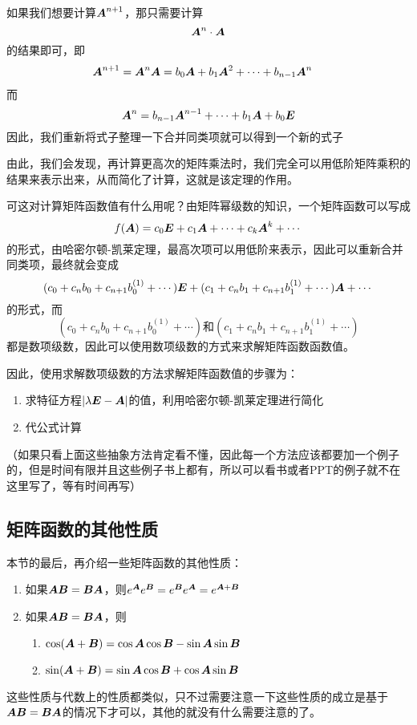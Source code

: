 \documentclass[12pt, a4paper, oneside, UTF8]{ctexbook}
\begin{document}
如果我们想要计算$\boldsymbol{A}^{n+1}$，那只需要计算\[\boldsymbol{A}^n\cdot\boldsymbol{A}\]的结果即可，即
\[
\begin{aligned}\boldsymbol{A}^{n+1}&=\boldsymbol{A}^n\boldsymbol{A}=b_0\boldsymbol{A}+b_1\boldsymbol{A}^2+\cdots+b_{n-1}\boldsymbol{A}^n
\end{aligned}\]
而\[\boldsymbol{A}^n=b_{n-1}\boldsymbol{A}^{n-1}+\cdots+b_1\boldsymbol{A}+b_0\boldsymbol{E}\]因此，我们重新将式子整理一下合并同类项就可以得到一个新的式子

由此，我们会发现，再计算更高次的矩阵乘法时，我们完全可以用低阶矩阵乘积的结果来表示出来，从而简化了计算，这就是该定理的作用。

可这对计算矩阵函数值有什么用呢？由矩阵幂级数的知识，一个矩阵函数可以写成\[f(\boldsymbol{A})=c_0\boldsymbol{E}+c_1\boldsymbol{A}+\cdots+c_k\boldsymbol{A}^k+\cdots\]的形式，由哈密尔顿-凯莱定理，最高次项可以用低阶来表示，因此可以重新合并同类项，最终就会变成\[(c_0+c_nb_0+c_{n+1}b_0^{(1)}+\cdots)\boldsymbol{E}+(c_1+c_nb_1+c_{n+1}b_1^{(1)}+\cdots)\boldsymbol{A}+\cdots\]的形式，而\[(c_0+c_nb_0+c_{n+1}b_0^{(1)}+\cdots)\text{和}(c_1+c_nb_1+c_{n+1}b_1^{(1)}+\cdots)\]都是数项级数，因此可以使用数项级数的方式来求解矩阵函数函数值。

因此，使用求解数项级数的方法求解矩阵函数值的步骤为：
\begin{enumerate}[leftmargin=4em]
    \item 求特征方程$|\lambda\boldsymbol{E}-\boldsymbol{A}|$的值，利用哈密尔顿-凯莱定理进行简化
    \item 代公式计算
\end{enumerate}
（如果只看上面这些抽象方法肯定看不懂，因此每一个方法应该都要加一个例子的，但是时间有限并且这些例子书上都有，所以可以看书或者PPT的例子就不在这里写了，等有时间再写）

\subsection{矩阵函数的其他性质}
本节的最后，再介绍一些矩阵函数的其他性质：
\begin{enumerate}[leftmargin=4em]
    \item 如果$\boldsymbol{A}\boldsymbol{B}=\boldsymbol{B}\boldsymbol{A}$，则$e^{\boldsymbol{A}}e^{\boldsymbol{B}}=e^{\boldsymbol{B}}e^{\boldsymbol{A}}=e^{\boldsymbol{A}+\boldsymbol{B}}$
    \item 如果$\boldsymbol{A}\boldsymbol{B}=\boldsymbol{B}\boldsymbol{A}$，则\begin{enumerate}
        \item $\cos(\boldsymbol{A}+\boldsymbol{B})=\cos\boldsymbol{A}\cos\boldsymbol{B}-\sin\boldsymbol{A}\sin\boldsymbol{B}$
        \item $\sin(\boldsymbol{A}+\boldsymbol{B})=\sin\boldsymbol{A}\cos\boldsymbol{B}+\cos\boldsymbol{A}\sin\boldsymbol{B}$
    \end{enumerate}
\end{enumerate}

这些性质与代数上的性质都类似，只不过需要注意一下这些性质的成立是基于$\boldsymbol{A}\boldsymbol{B}=\boldsymbol{B}\boldsymbol{A}$的情况下才可以，其他的就没有什么需要注意的了。
\ifx\allfiles\undefined
\end{document}
